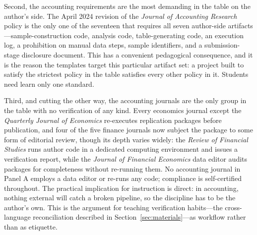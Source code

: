 \documentclass[12pt]{article}
\begin{document}
Second, the accounting requirements are the most demanding in the table
on the author's side. The April 2024 revision of the \textit{Journal of
Accounting Research} policy is the only one of the seventeen that
requires all seven author-side artifacts---sample-construction code,
analysis code, table-generating code, an execution log, a prohibition on
manual data steps, sample identifiers, and a submission-stage disclosure
document. This has a convenient pedagogical consequence, and it is the
reason the templates target this particular artifact set: a project built
to satisfy the strictest policy in the table satisfies every other policy
in it. Students need learn only one standard.

Third, and cutting the other way, the accounting journals are the only
group in the table with no verification of any kind. Every economics
journal except the \textit{Quarterly Journal of Economics} re-executes
replication packages before publication, and four of the five finance
journals now subject the package to some form of editorial review,
though its depth varies widely: the \textit{Review of Financial
Studies} runs
author code in a dedicated computing environment and issues a
verification report, while the \textit{Journal of Financial Economics}
data editor audits packages for completeness without re-running them.
No accounting journal in Panel A employs a data editor or re-runs any
code; compliance is self-certified throughout. The
practical implication for instruction is direct: in accounting, nothing
external will catch a broken pipeline, so the discipline has to be the
author's own. This is the argument for teaching verification habits---the
cross-language reconciliation described in
Section~\ref{sec:materials}---as workflow rather than as etiquette.
\end{document}
